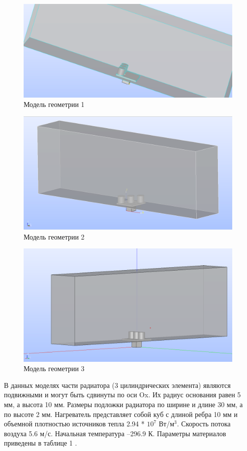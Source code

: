 \documentclass[a4paper,12pt]{article}
\theoremstyle{plain} %
\theoremstyle{definition} %
\theoremstyle{remark} %
\begin{document}
\begin{figure}[h]
	\begin{center}
		\includegraphics[width=0.5\linewidth]{2.1.png}
		\caption{Модель геометрии 1} %
	\end{center}
\end{figure}
\begin{figure}[h]
	\begin{center}
		\includegraphics[width=0.5\linewidth]{2.2.png}
		\caption{Модель геометрии 2}
	\end{center}
\end{figure}
\newpage
\begin{figure}[h]
	\begin{center}
		\includegraphics[width=0.5\linewidth]{2.3.png}
		\caption{Модель геометрии 3}
	\end{center}
\end{figure}

\par
В данных моделях части радиатора (3 цилиндрических элемента) являются подвижными и могут быть сдвинуты по оси Ox. Их радиус основания равен 5 мм, а высота 10 мм. 
Размеры подложки радиатора по ширине и длине 30 мм, а по высоте 2 мм. Нагреватель представляет собой куб с длиной ребра 10 мм и объемной плотностью источников тепла 2.94 * $10^7$ Вт/$м^3$. 
Скорость потока воздуха 5.6 м/с. Начальная температура –296.9 К. Параметры материалов приведены в таблице 1 \cite{aHeatTranserf}.
\end{document}
